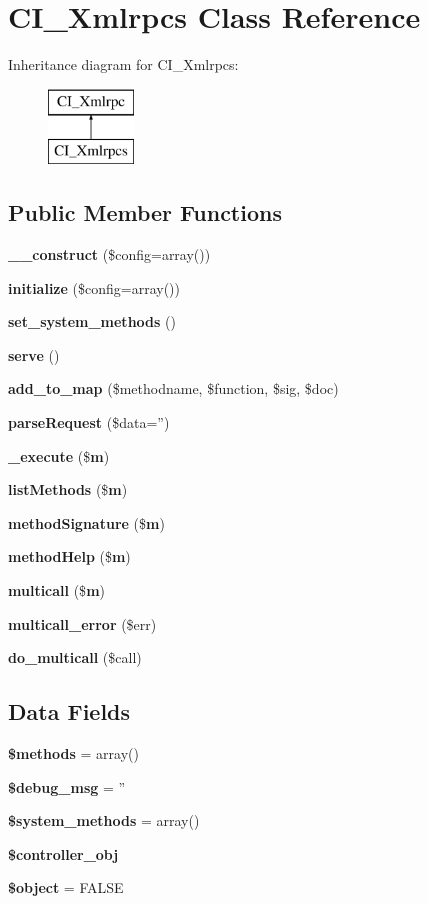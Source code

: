 \section{C\-I\-\_\-\-Xmlrpcs Class Reference}
\label{class_c_i___xmlrpcs}
Inheritance diagram for C\-I\-\_\-\-Xmlrpcs\-:\begin{figure}[H]
\begin{center}
\leavevmode
\includegraphics[height=2.000000cm]{class_c_i___xmlrpcs}
\end{center}
\end{figure}
\subsection*{Public Member Functions}
\begin{DoxyCompactItemize}
\item 
{\bf \-\_\-\-\_\-construct} (\$config=array())
\item 
{\bf initialize} (\$config=array())
\item 
{\bf set\-\_\-system\-\_\-methods} ()
\item 
{\bf serve} ()
\item 
{\bf add\-\_\-to\-\_\-map} (\$methodname, \$function, \$sig, \$doc)
\item 
{\bf parse\-Request} (\$data='')
\item 
{\bf \-\_\-execute} (\${\bf m})
\item 
{\bf list\-Methods} (\${\bf m})
\item 
{\bf method\-Signature} (\${\bf m})
\item 
{\bf method\-Help} (\${\bf m})
\item 
{\bf multicall} (\${\bf m})
\item 
{\bf multicall\-\_\-error} (\$err)
\item 
{\bf do\-\_\-multicall} (\$call)
\end{DoxyCompactItemize}
\subsection*{Data Fields}
\begin{DoxyCompactItemize}
\item 
{\bf \$methods} = array()
\item 
{\bf \$debug\-\_\-msg} = ''
\item 
{\bf \$system\-\_\-methods} = array()
\item 
{\bf \$controller\-\_\-obj}
\item 
{\bf \$object} = F\-A\-L\-S\-E
\end{DoxyCompactItemize}


